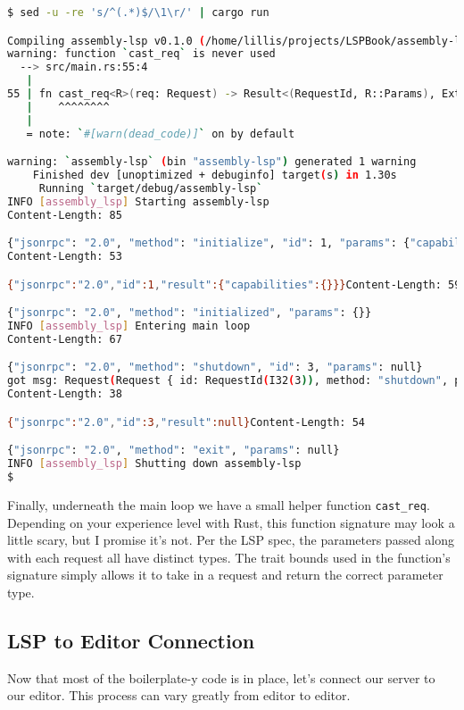 \begin{lstlisting}[language=bash]
$ sed -u -re 's/^(.*)$/\1\r/' | cargo run

Compiling assembly-lsp v0.1.0 (/home/lillis/projects/LSPBook/assembly-lsp)
warning: function `cast_req` is never used
  --> src/main.rs:55:4
   |
55 | fn cast_req<R>(req: Request) -> Result<(RequestId, R::Params), ExtractError<Request>>
   |    ^^^^^^^^
   |
   = note: `#[warn(dead_code)]` on by default

warning: `assembly-lsp` (bin "assembly-lsp") generated 1 warning
    Finished dev [unoptimized + debuginfo] target(s) in 1.30s
     Running `target/debug/assembly-lsp`
INFO [assembly_lsp] Starting assembly-lsp
Content-Length: 85

{"jsonrpc": "2.0", "method": "initialize", "id": 1, "params": {"capabilities": {}}}
Content-Length: 53

{"jsonrpc":"2.0","id":1,"result":{"capabilities":{}}}Content-Length: 59

{"jsonrpc": "2.0", "method": "initialized", "params": {}}
INFO [assembly_lsp] Entering main loop
Content-Length: 67

{"jsonrpc": "2.0", "method": "shutdown", "id": 3, "params": null}
got msg: Request(Request { id: RequestId(I32(3)), method: "shutdown", params: Null })
Content-Length: 38

{"jsonrpc":"2.0","id":3,"result":null}Content-Length: 54

{"jsonrpc": "2.0", "method": "exit", "params": null}
INFO [assembly_lsp] Shutting down assembly-lsp
$
\end{lstlisting}

Finally, underneath the main loop we have a small helper function \texttt{cast\_req}. Depending on your experience level with Rust, this function signature may look a little scary, but I promise it's not. Per the LSP spec, the parameters passed along with each request all have distinct types. The trait bounds used in the function's signature simply allows it to take in a request and return the correct parameter type.

\subsection{LSP to Editor Connection}

Now that most of the boilerplate-y code is in place, let's connect our server to our editor. This process can vary greatly from editor to editor.

